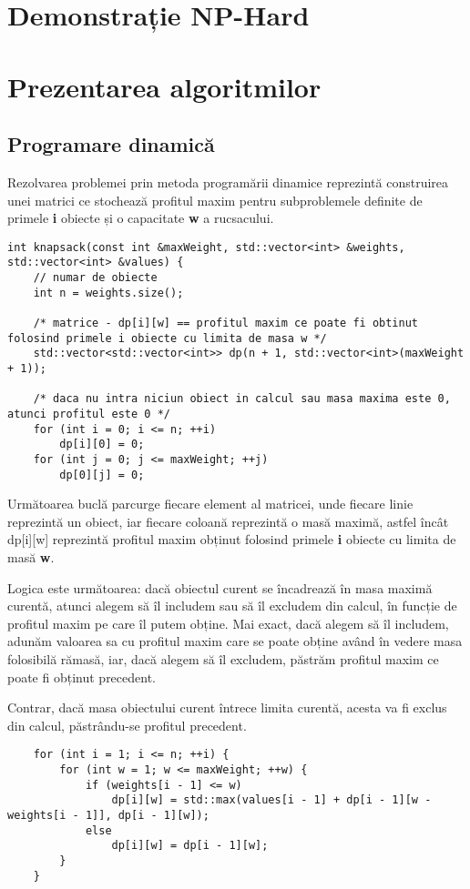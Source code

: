 \documentclass[runningheads]{llncs}
\begin{document}
{\section{Demonstrație NP-Hard}

\section{Prezentarea algoritmilor}
\subsection{Programare dinamică}
Rezolvarea problemei prin metoda programării dinamice reprezintă construirea
unei matrici ce stochează profitul maxim pentru subproblemele definite de
primele \textbf{i} obiecte și o capacitate \textbf{w} a rucsacului.

\begin{lstlisting}
int knapsack(const int &maxWeight, std::vector<int> &weights, std::vector<int> &values) {
	// numar de obiecte
	int n = weights.size();

	/* matrice - dp[i][w] == profitul maxim ce poate fi obtinut folosind primele i obiecte cu limita de masa w */
	std::vector<std::vector<int>> dp(n + 1, std::vector<int>(maxWeight + 1));

	/* daca nu intra niciun obiect in calcul sau masa maxima este 0, atunci profitul este 0 */
	for (int i = 0; i <= n; ++i)
		dp[i][0] = 0;
	for (int j = 0; j <= maxWeight; ++j)
		dp[0][j] = 0;
\end{lstlisting}

Următoarea buclă parcurge fiecare element al matricei, unde fiecare linie
reprezintă un obiect, iar fiecare coloană reprezintă o masă maximă, astfel
încât dp[i][w] reprezintă profitul maxim obținut folosind primele \textbf{i}
obiecte cu limita de masă \textbf{w}.

Logica este următoarea: dacă obiectul curent
se încadrează în masa maximă curentă, atunci alegem să îl includem sau să îl
excludem din calcul, în funcție de profitul maxim pe care îl putem obține. Mai exact,
dacă alegem să îl includem, adunăm valoarea sa cu profitul maxim care se poate obține
având în vedere masa folosibilă rămasă, iar, dacă alegem să îl excludem, păstrăm profitul
maxim ce poate fi obținut precedent.

Contrar, dacă masa obiectului curent întrece limita curentă, acesta va fi exclus din calcul,
păstrându-se profitul precedent.

\begin{lstlisting}
	for (int i = 1; i <= n; ++i) {
		for (int w = 1; w <= maxWeight; ++w) {
			if (weights[i - 1] <= w)
				dp[i][w] = std::max(values[i - 1] + dp[i - 1][w - weights[i - 1]], dp[i - 1][w]);
			else
				dp[i][w] = dp[i - 1][w];
		}
	}


\end{lstlisting}}
\end{document}
